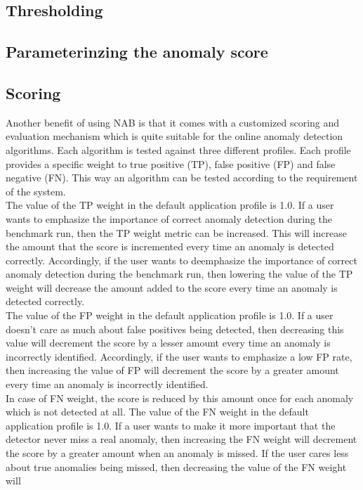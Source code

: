 \documentclass[12pt]{article}
\begin{document}
\subsection{Thresholding}

\subsection{Parameterinzing the anomaly score}
\subsection{Scoring}
Another benefit of using NAB is that it comes with a customized scoring and evaluation mechanism which is quite suitable for the online anomaly detection algorithms. Each algorithm is tested against three different profiles. Each profile provides a specific weight to true positive (TP), false positive (FP) and false negative (FN). This way an algorithm can be tested according to the requirement of the system.\\
\break
The value of the TP weight in the default application profile is 1.0. If a
user wants to emphasize the importance of correct anomaly detection during the
benchmark run, then the TP weight metric can be increased. This will increase
the amount that the score is incremented every time an anomaly is detected
correctly. Accordingly, if the user wants to deemphasize the importance of
correct anomaly detection during the benchmark run, then lowering the value of
the TP weight will decrease the amount added to the score every time an
anomaly is detected correctly.\\
\break
The value of the FP weight in the default application profile is 1.0. If a user
doesn’t care as much about false positives being detected, then decreasing this
value will decrement the score by a lesser amount every time an anomaly is
incorrectly identified. Accordingly, if the user wants to emphasize a low FP rate,
then increasing the value of FP will decrement the score by a greater amount
every time an anomaly is incorrectly identified.\\
\break
In case of FN weight, the score is reduced by this amount once for each anomaly
which is not detected at all. The value of the FN weight in the default application
profile is 1.0. If a user wants to make it more important that the detector never
miss a real anomaly, then increasing the FN weight will decrement the score by a
greater amount when an anomaly is missed. If the user cares less about true
anomalies being missed, then decreasing the value of the FN weight will
\end{document}

